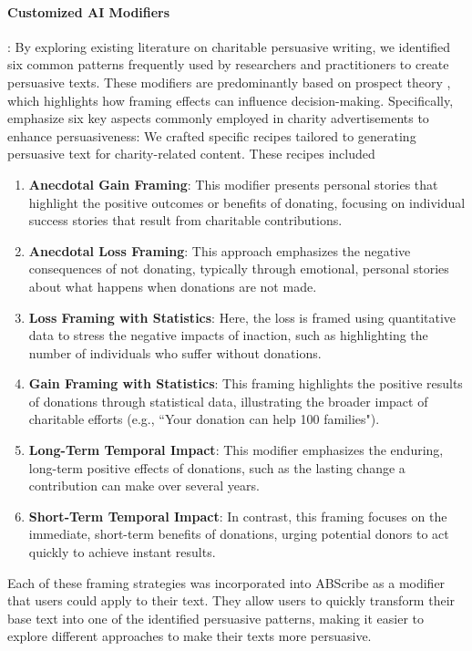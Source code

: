 \paragraph{\textbf{Customized AI Modifiers}}: 
By exploring existing literature on charitable persuasive writing, we identified six common patterns frequently used by researchers and practitioners to create persuasive texts. These modifiers are predominantly based on prospect theory \cite{Kahneman2013-gu}, which highlights how framing effects can influence decision-making. Specifically, \citet{Wymer2023-pg} emphasize six key aspects commonly employed in charity advertisements to enhance persuasiveness: We crafted specific recipes tailored to generating persuasive text for charity-related content. These recipes included

\begin{enumerate}
    \item \textbf{Anecdotal Gain Framing}: This modifier presents personal stories that highlight the positive outcomes or benefits of donating, focusing on individual success stories that result from charitable contributions.
    \item \textbf{Anecdotal Loss Framing}: This approach emphasizes the negative consequences of not donating, typically through emotional, personal stories about what happens when donations are not made.
    \item \textbf{Loss Framing with Statistics}: Here, the loss is framed using quantitative data to stress the negative impacts of inaction, such as highlighting the number of individuals who suffer without donations.
    \item \textbf{Gain Framing with Statistics}: This framing highlights the positive results of donations through statistical data, illustrating the broader impact of charitable efforts (e.g., ``Your donation can help 100 families").
    \item \textbf{Long-Term Temporal Impact}: This modifier emphasizes the enduring, long-term positive effects of donations, such as the lasting change a contribution can make over several years.
    \item \textbf{Short-Term Temporal Impact}: In contrast, this framing focuses on the immediate, short-term benefits of donations, urging potential donors to act quickly to achieve instant results.
\end{enumerate}

Each of these framing strategies was incorporated into ABScribe as a modifier that users could apply to their text. They allow users to quickly transform their base text into one of the identified persuasive patterns, making it easier to explore different approaches to make their texts more persuasive.

